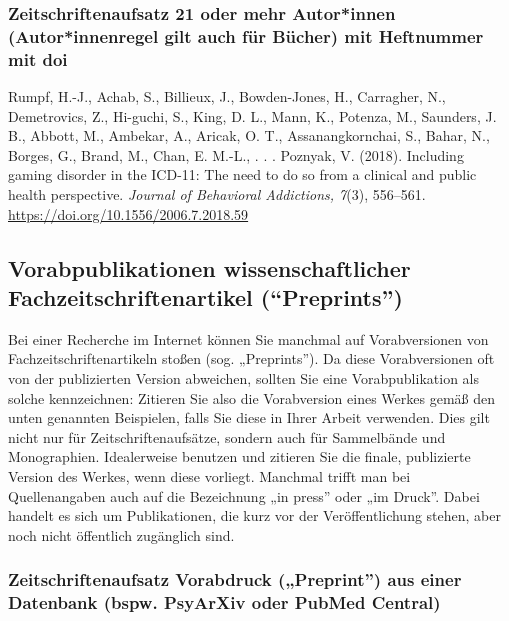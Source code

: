 \documentclass[
  letterpaper,
  DIV=11]{scrreprt}
\begin{document}
\hypertarget{zeitschriftenaufsatz-21-oder-mehr-autorinnen-autorinnenregel-gilt-auch-fuxfcr-buxfccher-mit-heftnummer-mit-doi}{%
\subsubsection{Zeitschriftenaufsatz \textbar{} 21 oder mehr Autor*innen
(Autor*innenregel gilt auch für Bücher) \textbar{} mit Heftnummer
\textbar{} mit
doi}\label{zeitschriftenaufsatz-21-oder-mehr-autorinnen-autorinnenregel-gilt-auch-fuxfcr-buxfccher-mit-heftnummer-mit-doi}}

Rumpf, H.-J., Achab, S., Billieux, J., Bowden-Jones, H., Carragher, N.,
Demetrovics, Z., Hi-guchi, S., King, D. L., Mann, K., Potenza, M.,
Saunders, J. B., Abbott, M., Ambekar, A., Aricak, O. T.,
Assanangkornchai, S., Bahar, N., Borges, G., Brand, M., Chan, E. M.-L.,
. . . Poznyak, V. (2018). Including gaming disorder in the ICD-11: The
need to do so from a clinical and public health perspective.
\emph{Journal of Behavioral Addictions, 7}(3), 556--561.
\url{https://doi.org/10.1556/2006.7.2018.59}

\hypertarget{vorabpublikationen-wissenschaftlicher-fachzeitschriftenartikel-preprints}{%
\subsection{Vorabpublikationen wissenschaftlicher
Fachzeitschriftenartikel
(``Preprints'')}\label{vorabpublikationen-wissenschaftlicher-fachzeitschriftenartikel-preprints}}

Bei einer Recherche im Internet können Sie manchmal auf Vorabversionen
von Fachzeitschriftenartikeln stoßen (sog. „Preprints''). Da diese
Vorabversionen oft von der publizierten Version abweichen, sollten Sie
eine Vorabpublikation als solche kennzeichnen: Zitieren Sie also die
Vorabversion eines Werkes gemäß den unten genannten Beispielen, falls
Sie diese in Ihrer Arbeit verwenden. Dies gilt nicht nur für
Zeitschriftenaufsätze, sondern auch für Sammelbände und Monographien.
Idealerweise benutzen und zitieren Sie die finale, publizierte Version
des Werkes, wenn diese vorliegt. Manchmal trifft man bei Quellenangaben
auch auf die Bezeichnung „in press'' oder „im Druck''. Dabei handelt es
sich um Publikationen, die kurz vor der Veröffentlichung stehen, aber
noch nicht öffentlich zugänglich sind.

\hypertarget{zeitschriftenaufsatz-vorabdruck-preprint-aus-einer-datenbank-bspw.-psyarxiv-oder-pubmed-central}{%
\subsubsection{Zeitschriftenaufsatz \textbar{} Vorabdruck („Preprint'')
aus einer Datenbank (bspw. PsyArXiv oder PubMed
Central)}\label{zeitschriftenaufsatz-vorabdruck-preprint-aus-einer-datenbank-bspw.-psyarxiv-oder-pubmed-central}}
\end{document}
